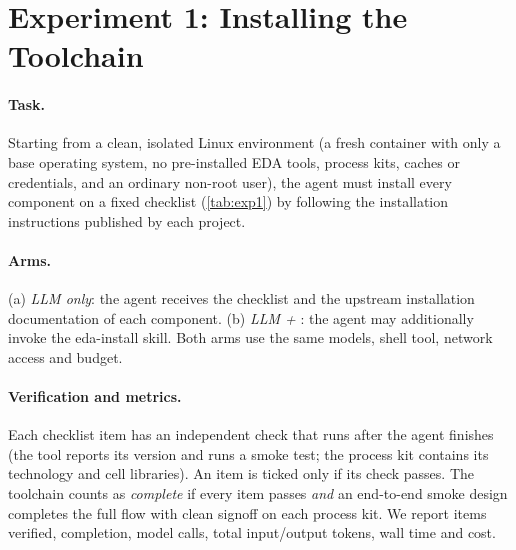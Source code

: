 \section{Experiment 1: Installing the Toolchain}
\label{sec:exp1}

\paragraph{Task.}
Starting from a clean, isolated Linux environment (a fresh container with only a base operating
system, no pre-installed EDA tools, process kits, caches or credentials, and an ordinary non-root
user), the agent must install every component on a fixed checklist (\cref{tab:exp1}) by following
the installation instructions published by each project.

\paragraph{Arms.}
 (a) \emph{LLM only}: the agent receives the checklist and the upstream
installation documentation of each component. (b) \emph{LLM + \R}: the agent may additionally invoke
the eda-install skill. Both arms use the same models, shell tool, network access and budget.

\paragraph{Verification and metrics.}
Each checklist item has an independent check that runs after the agent finishes (\eg the tool
reports its version and runs a smoke test; the process kit contains its technology and cell
libraries). An item is ticked only if its check passes. The toolchain counts as \emph{complete} if
every item passes \emph{and} an end-to-end smoke design completes the full flow with clean signoff on
each process kit. We report items verified, completion, model calls, total input/output tokens,
wall time and cost.

